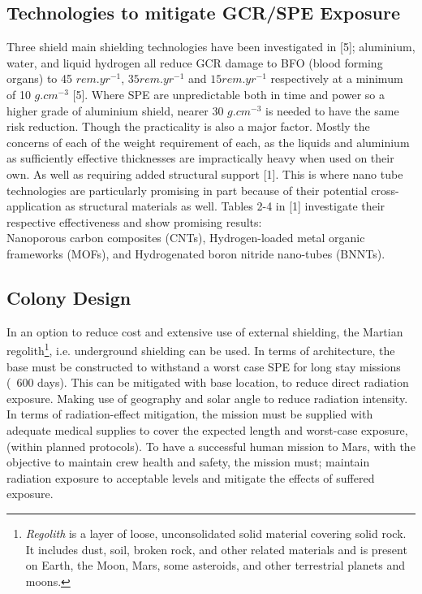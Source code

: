 \documentclass[12pt]{article}
\begin{document}
\subsection{Technologies to mitigate GCR/SPE Exposure}
Three shield main shielding technologies have been investigated in [5]; aluminium, water, and liquid hydrogen all reduce GCR damage to BFO (blood forming organs) to 45 $rem.yr^{-1}$, $35 rem.yr^{-1}$ and $15 rem.yr^{-1}$ respectively at a minimum of 10 $g.cm^{-3}$ [5]. Where SPE are unpredictable both in time and power so a higher grade of aluminium shield, nearer 30 $g.cm^{-3}$ is needed to have the same risk reduction. Though the practicality is also a major factor. Mostly the concerns of each of the weight requirement of each, as the liquids and aluminium as sufficiently effective thicknesses are impractically heavy when used on their own. As well as requiring added structural support [1].
This is where nano tube technologies are particularly promising in part because of their potential cross-application as structural materials as well.
Tables 2-4 in [1] investigate their respective effectiveness and show promising results:\\
Nanoporous carbon composites (CNTs), Hydrogen-loaded metal organic frameworks (MOFs), and Hydrogenated boron nitride nano-tubes (BNNTs).
\subsection{Colony Design}
In an option to reduce cost and extensive use of external shielding, the Martian regolith\footnote{\textit{Regolith} is a layer of loose, unconsolidated solid material covering solid rock. It includes dust, soil, broken rock, and other related materials and is present on Earth, the Moon, Mars, some asteroids, and other terrestrial planets and moons.
}, i.e. underground shielding can be used.
In terms of architecture, the base must be constructed to withstand a worst case SPE for long stay missions (~600 days). This can be mitigated with base location, to reduce direct radiation exposure. Making use of geography and solar angle to reduce radiation intensity. In terms of radiation-effect mitigation, the mission must be supplied with adequate medical supplies to cover the expected length and worst-case exposure, (within planned protocols).
To have a successful human mission to Mars, with the objective to maintain crew health and safety, the mission must; maintain radiation exposure to acceptable levels and mitigate the effects of suffered exposure.
\end{document}
